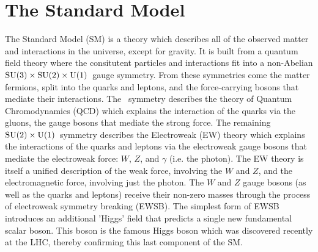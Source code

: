 






\section{The Standard Model}

The Standard Model (SM) is a theory which describes all of the
observed matter and interactions in the universe, except for gravity.
It is built from a quantum field theory where the consitutent particles
and interactions fit into a non-Abelian 
$\textrm{SU(3)}\times\textrm{SU(2)}\times\textrm{U(1)}$~gauge symmetry.
From these symmetries come the matter fermions, split 
into the quarks and leptons, and the force-carrying bosons
that mediate their interactions.
The \suthree~symmetry describes the theory of Quantum Chromodynamics (QCD)
which explains the interaction of the quarks via the gluons, the
gauge bosons that mediate the strong force.
The remaining $\textrm{SU(2)}\times\textrm{U(1)}$~symmetry 
describes the Electroweak (EW) theory which explains
the interactions of the quarks and leptons via the 
electroweak gauge bosons that mediate
the electroweak force: $W$, $Z$, and $\gamma$ (i.e. the photon).
The EW theory is itself a unified description of the weak force,
involving the $W$ and $Z$, and the electromagnetic force, involving
just the photon.
The $W$ and $Z$ gauge bosons (as well as the quarks and leptons) receive
their non-zero masses through the process of electroweak symmetry
breaking (EWSB). The simplest form of EWSB
introduces an additional 'Higgs' field that
predicts a single new fundamental scalar boson. This boson is the
famous Higgs boson which was discovered recently at the LHC, thereby
confirming this last component of the SM.

